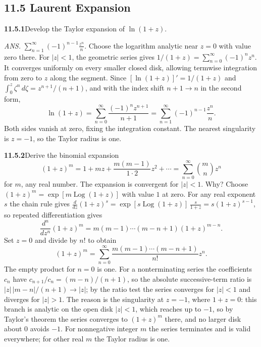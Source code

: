 \subsection*{11.5 Laurent Expansion}

\par\bigskip
\noindent\textbf{11.5.1}\quad Develop the Taylor expansion of $\ln(1+z)$.
\par\nobreak\hfill\emph{ANS.}\enspace
$\displaystyle\sum_{n=1}^{\infty}(-1)^{n-1}\frac{z^{n}}{n}$.
\solution
Choose the logarithm analytic near $z=0$ with value zero there.
For $|z|<1$, the geometric series gives
$1/(1+z)=\sum_{n=0}^\infty(-1)^nz^n$.
It converges uniformly on every smaller closed disk, allowing
termwise integration from zero to $z$ along the segment. Since
$[\ln(1+z)]'=1/(1+z)$ and $\int_0^z\zeta^n\,d\zeta=z^{n+1}/(n+1)$,
and with the index shift $n+1\to n$ in the second form,
\[
\boxed{\ln(1+z)=\sum_{n=0}^\infty\frac{(-1)^nz^{n+1}}{n+1}
=\sum_{n=1}^\infty(-1)^{n-1}\frac{z^n}{n}}.
\]
Both sides vanish at zero, fixing the integration constant.
The nearest singularity is $z=-1$, so the Taylor radius is one.

\par\bigskip
\noindent\textbf{11.5.2}\quad Derive the binomial expansion
\[
(1+z)^{m}=1+mz+\frac{m(m-1)}{1\cdot2}z^{2}+\cdots
=\sum_{n=0}^{\infty}\binom{m}{n}z^{n}
\]
for $m$, any real number. The expansion is convergent for $|z|<1$. Why?
\solution
Choose $(1+z)^m=\exp[m\operatorname{Log}(1+z)]$ with value $1$
at zero. For any real exponent $s$ the chain rule gives
$\frac{d}{dz}(1+z)^s=\exp[s\operatorname{Log}(1+z)]\,\frac{s}{1+z}
=s(1+z)^{s-1}$, so repeated differentiation gives
\[
\frac{d^n}{dz^n}(1+z)^m
=m(m-1)\cdots(m-n+1)(1+z)^{m-n}.
\]
Set $z=0$ and divide by $n!$ to obtain
\[
\boxed{(1+z)^m=\sum_{n=0}^\infty
\frac{m(m-1)\cdots(m-n+1)}{n!}z^n}.
\]
The empty product for $n=0$ is one. For a nonterminating series the
coefficients $c_n$ have $c_{n+1}/c_n=(m-n)/(n+1)$, so the absolute
successive-term ratio is $|z|\,|m-n|/(n+1)\to|z|$; by the ratio test
the series converges for $|z|<1$ and diverges for $|z|>1$.
The reason is the singularity at $z=-1$, where $1+z=0$: this branch is
analytic on the open disk $|z|<1$, which reaches up to $-1$, so by
Taylor's theorem the series converges to $(1+z)^m$ there, and no
larger disk about $0$ avoids $-1$.
For nonnegative integer $m$ the series terminates and is valid
everywhere; for other real $m$ the Taylor radius is one.

